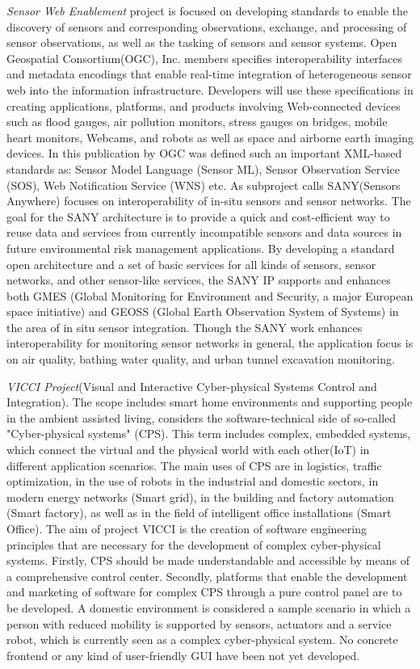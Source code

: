 	\emph{Sensor Web Enablement} project\cite{ogc} is focused on developing standards to enable the discovery of sensors and corresponding observations, exchange, and processing of sensor observations, as well as the tasking of sensors and sensor systems. Open Geospatial Consortium(OGC), Inc. members specifies interoperability interfaces and metadata encodings that enable real-time integration of heterogeneous sensor web into the information infrastructure. Developers will use these specifications in creating applications, platforms, and products involving Web-connected devices such as flood gauges, air pollution monitors, stress gauges on bridges, mobile heart monitors, Webcams, and robots as well as space and airborne earth imaging devices. In this publication by OGC was defined such an important XML-based standards as: Sensor Model Language (Sensor ML), Sensor Observation Service (SOS), Web Notification Service (WNS) etc. As subproject calls SANY(Sensors Anywhere) focuses on interoperability of in-situ sensors and sensor networks. The goal for the SANY architecture is to provide a quick and cost-efficient way to reuse data and services from currently incompatible sensors and data sources in future environmental risk management applications. By developing a standard open architecture and a set of basic services for all kinds of sensors, sensor networks, and other sensor-like services, the SANY IP supports and enhances both GMES (Global Monitoring for Environment and Security, a major European space initiative) and GEOSS (Global Earth Observation System of Systems) in the area of in situ sensor integration. Though the SANY work enhances interoperability for monitoring sensor networks in general, the application focus is on air quality, bathing water quality, and urban tunnel excavation monitoring.
 
    \emph{VICCI Project}(Visual and Interactive Cyber-physical Systems Control and Integration)\cite{vicci,6548811}. The scope includes smart home environments and supporting people in the ambient assisted living, considers the software-technical side of so-called "Cyber-physical systems" (CPS). This term includes complex, embedded systems, which connect the virtual and the physical world with each other(IoT) in different application scenarios. The main uses of CPS are in logistics, traffic optimization, in the use of robots in the industrial and domestic sectors, in modern energy networks (Smart grid), in the building and factory automation (Smart factory), as well as in the field of intelligent office installations (Smart Office). The aim of project VICCI is the creation of software engineering principles that are necessary for the development of complex cyber-physical systems. Firstly, CPS should be made understandable and accessible by means of a comprehensive control center. Secondly, platforms that enable the development and marketing of software for complex CPS through a pure control panel are to be developed. A domestic environment is considered a sample scenario in which a person with reduced mobility is supported by sensors, actuators and a service robot, which is currently seen as a complex cyber-physical system. No concrete frontend or any kind of user-friendly GUI have been not yet developed. 

